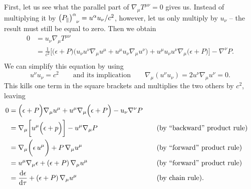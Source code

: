 First, let us see what the parallel part of $\nabla_\mu T^{\mu \nu} = 0$ gives us.
Instead of multiplying it by $\left(P_\parallel\right)\indices{^\alpha_\nu} = u^\alpha u_\nu /c^2$, however, let us only multiply by $u_\nu$ -- the result must still be equal to zero.
Then we obtain
\begin{equation}
\begin{split}
	0 &= u_\nu \nabla_\mu T^{\mu \nu} \\
	  &= \frac{1}{c^2} \bigg[ \Big( \epsilon + P \Big) \Big( u_\nu u^\nu \nabla_\mu u^\mu + u^\mu u_\nu \nabla_\mu u^\nu \Big) + u^\mu u_\nu u^\nu \nabla_\mu \Big( \epsilon + P \Big) \bigg] - \nabla^\nu P . \\
\end{split}
\end{equation}
We can simplify this equation by using
\begin{equation}
	u^\nu u_\nu = c^2 
	\qquad \text{and its implication} \qquad
	\nabla_\mu \left( u^\nu u_\nu \right) = 2 u^\nu \nabla_\mu u^\nu = 0 .
\label{eq:relfluid:tricks}
\end{equation}
This kills one term in the square brackets and multiplies the two others by $c^2$, leaving
\begin{subequations}
\begin{align}
	  0 &= \Big(\epsilon + P \Big) \nabla_\mu u^\mu + u^\mu \nabla_\mu \Big( \epsilon + P \Big) - u_\nu \nabla^\nu P \nonumber \\
	    &= \nabla_\mu \bigg[ u^\mu \Big( \epsilon + p \Big)  \bigg] - u^\mu \nabla_\mu P && \quad \text{(by ``backward'' product rule)} \nonumber \\
	    &= \nabla_\mu \bigg( \epsilon \, u^\mu \bigg) + P \, \nabla_\mu u^\mu && \quad \text{(by ``forward'' product rule)} \label{eq:relfluid:energy_conservation_before_product} \\
	    &= u^\mu \nabla_\mu \epsilon + \left( \epsilon + P \right) \nabla_\mu u^\mu && \quad \text{(by ``forward'' product rule)} \label{eq:relfluid:energy_conservation_after_product} \\
	    &= \odv{\epsilon}{\tau} + \left( \epsilon + P \right) \nabla_\mu u^\mu && \quad \text{(by chain rule)} . \label{eq:relfluid:energy_conservation_after_chain}
\end{align}%
\label{eq:relfluid:energy_conservation}%
\end{subequations}%
